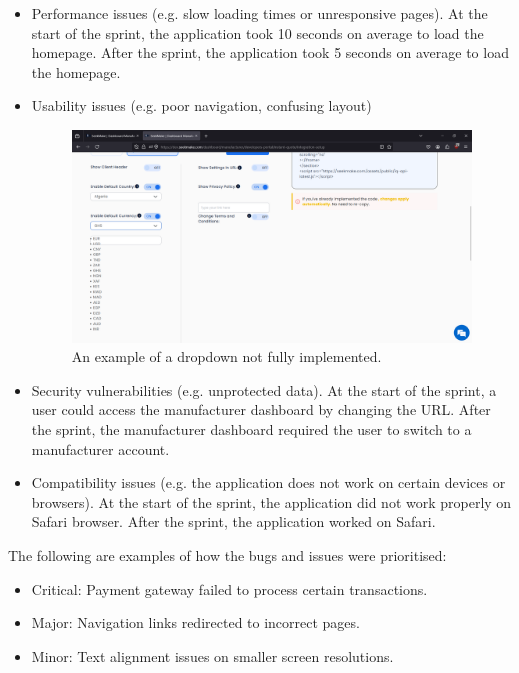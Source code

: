 \begin{itemize}
    \item Performance issues (e.g. slow loading times or unresponsive pages). At the start of the sprint, the application took 10 seconds on average to load the homepage. After the sprint, the application took 5 seconds on average to load the homepage.
    \item Usability issues (e.g. poor navigation, confusing layout)
          \begin{figure}[H]
              \centering
              \includegraphics[width=\textwidth]{project/images/dropdown-broken.png}
              \caption{An example of a dropdown not fully implemented.}
              \label{fig:dropdown-broken}
          \end{figure}
    \item Security vulnerabilities (e.g. unprotected data). At the start of the sprint, a user could access the manufacturer dashboard by changing the URL. After the sprint, the manufacturer dashboard required the user to switch to a manufacturer account.
    \item Compatibility issues (e.g. the application does not work on certain devices or browsers). At the start of the sprint, the application did not work properly on Safari browser. After the sprint, the application worked on Safari.
\end{itemize}

The following are examples of how the bugs and issues were prioritised:
\begin{itemize}
    \item Critical: Payment gateway failed to process certain transactions.
    \item Major: Navigation links redirected to incorrect pages.
    \item Minor: Text alignment issues on smaller screen resolutions.
\end{itemize}

